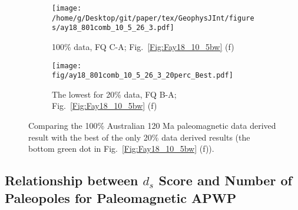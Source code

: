 \begin{figure*}[tbp]
  \captionsetup[subfigure]{labelformat=empty,aboveskip=-6pt,belowskip=-6pt}
  \centering
  \begin{subfigure}[htbp]{.49\textwidth}
    \captionsetup{skip=0pt}
    \centering
    \texttt{[image: /home/g/Desktop/git/paper/tex/GeophysJInt/figures/ay18\_801comb\_10\_5\_26\_3.pdf]}
    \caption{100\% data, FQ C-A; Fig.~\ref{Fig:Fay18_10_5bw}
    (f)}\label{Fig:Fay18_10_5w801}
  \end{subfigure}
  \begin{subfigure}[htbp]{.49\textwidth}
    \captionsetup{skip=0pt}
    \centering
    \texttt{[image: fig/ay18\_801comb\_10\_5\_26\_3\_20perc\_Best.pdf]} %
    \caption{The lowest for 20\% data, FQ B-A; Fig.~\ref{Fig:Fay18_10_5bw}
    (f)}\label{Fig:Fay18_10_5w801l20p}
  \end{subfigure}
  \caption[Less data, better similarity?]{Comparing the 100\% Australian
  120 Ma paleomagnetic data derived result with the best of the only
  20\% data derived results (the bottom green dot in Fig.~\ref{Fig:Fay18_10_5bw}
  (f)).}\label{Fig:Fay18_10_5w801l20p_vs_100p}
\end{figure*}

\subsection{Relationship between $d_s$ Score and Number of Paleopoles for
Paleomagnetic APWP}

